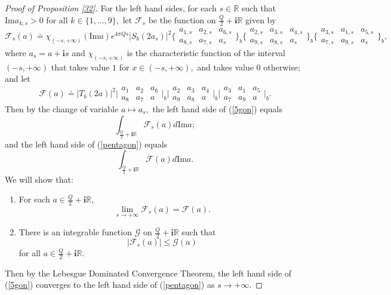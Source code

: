 \documentclass[11pt]{article}
\theoremstyle{remark}
\theoremstyle{remark}
\numberwithin{equation}{section}
\begin{document}
\begin{proof}[Proof of Proposition \ref{32}]
For the left hand sides, for each $s\in \mathbb R$ such that $\mathrm{Im}a_{k,s}>0$ for all $k\in\{1,\dots,9\},$ let $\mathcal F_s$ be the function on $\frac{Q}{2}+\mathbf i\mathbb R$ given by
$$\mathcal F_s(a)\doteq \chi_{(-s,+\infty)}(\mathrm{Im}a)e^{4\pi Q s}|S_b(2a_s)|^2
\bigg\{\begin{matrix} 
    a_{1,s} & a_{2,s} & a_{6,s}\\
      a_{8,s} & a_{7,s} & a_s 
   \end{matrix}\bigg\}_b
   \bigg\{\begin{matrix} 
    a_{2,s} & a_{3,s} & a_{4,s}\\
      a_{9,s} & a_{8,s} & a_s 
   \end{matrix}\bigg\}_b
 \bigg\{\begin{matrix} 
    a_{3,s} & a_{1,s} & a_{5,s}\\
      a_{7,s} & a_{9,s} & a_s 
   \end{matrix}\bigg\}_b,$$
   where $a_s=a+\mathbf is$ and $\chi_{(-s,+\infty)}$ is the characteristic function of the interval $(-s,+\infty)$ that takes value $1$ for $x\in (-s,+\infty),$ and takes value $0$ otherwise;
   and let 
   $$\mathcal F(a)\doteq |T_b(2a)|^2\bigg|\begin{matrix} 
    a_1 & a_2 & a_6\\
      a_8 & a_7 & a 
   \end{matrix}\bigg|_b
   \bigg|\begin{matrix} 
    a_2 & a_3 & a_4\\
      a_9 & a_8 & a 
   \end{matrix}\bigg|_b
   \bigg|\begin{matrix} 
    a_3 & a_1 & a_5\\
      a_7 & a_9 & a 
   \end{matrix}\bigg|_b.$$
Then by the change of variable $a\mapsto a_s,$ the left hand side of (\ref{5gon}) equals 
   $$\int_{\frac{Q}{2}+\mathbf i\mathbb R} \mathcal F_s(a) d\mathrm{Im}a;$$
   and the left hand side of (\ref{pentagon}) equals 
      $$\int_{\frac{Q}{2}+\mathbf i\mathbb R} \mathcal F(a) d\mathrm{Im}a.$$
We will show that:
\begin{enumerate}[(1)]
    \item For each $a \in \frac{Q}{2}+\mathbf i\mathbb R,$
    $$\lim_{s\to +\infty}\mathcal F_s(a)=\mathcal F(a).$$

    \item There is an integrable function $\mathcal G$ on $\frac{Q}{2}+\mathbf i \mathbb R$ such that 
    $$|\mathcal F_s(a)|\leqslant \mathcal G(a)$$
    for all $a\in \frac{Q}{2}+\mathbf i \mathbb R.$
\end{enumerate}
Then by the Lebesgue Dominated Convergence Theorem, the left hand side of (\ref{5gon}) converges to the left hand side of (\ref{pentagon}) as $s\to +\infty.$
\smallskip


\end{proof}
\end{document}
